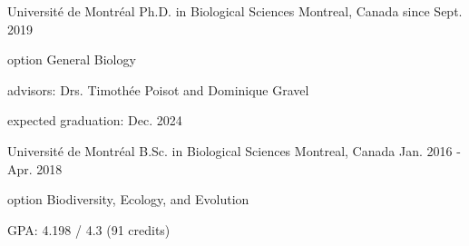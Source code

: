 
\begin{cventries}

  \cventry
    {Université de Montréal} %
    {Ph.D. in Biological Sciences} %
    {Montreal, Canada} %
    {since Sept. 2019} %
    {
      \begin{cvitems} %
        \item {option General Biology}
        \item {advisors: Drs. Timothée Poisot and Dominique Gravel}
        \item {expected graduation: Dec. 2024}
      \end{cvitems}
    }

\end{cventries}

\begin{cventries}

  \cventry
    {Université de Montréal} %
    {B.Sc. in Biological Sciences} %
    {Montreal, Canada} %
    {Jan. 2016 - Apr. 2018} %
    {
      \begin{cvitems} %
        \item {option Biodiversity, Ecology, and Evolution}
        \item {GPA: 4.198 / 4.3 (91 credits)}
      \end{cvitems}
    }

\end{cventries}



